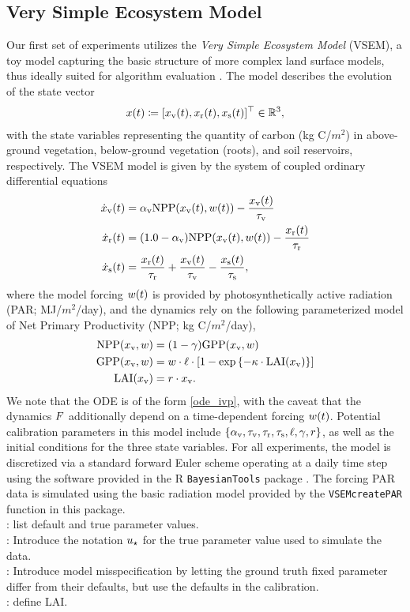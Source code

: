\documentclass[12pt]{article}
\begin{document}
\subsection{Very Simple Ecosystem Model} \label{vsem_example}
Our first set of experiments utilizes the \textit{Very Simple Ecosystem Model} (VSEM), a toy model capturing the basic 
structure of more complex land surface models, thus ideally suited for algorithm evaluation \citep{vsem}. The model 
describes the evolution of the state vector
\begin{align*}
x(t) \coloneqq [x_{\textrm{v}}(t), x_{\textrm{r}}(t), x_{\textrm{s}}(t)]^\top \in \mathbb{R}^{3}, 
\end{align*}
with the state variables representing the quantity of carbon (\textrm{kg C/$m^2$}) in above-ground vegetation, below-ground 
vegetation (roots), and soil reservoirs, respectively. The VSEM model is given by the system of coupled 
ordinary differential equations
\begin{align}
\dot{x}_{\textrm{v}}(t) &= \alpha_{\textrm{v}} \textrm{NPP}(x_{\textrm{v}}(t), w(t)) - \frac{x_{\textrm{v}}(t)}{\tau_{\textrm{v}}} \\
\dot{x}_{\textrm{r}}(t) &= (1.0 - \alpha_{\textrm{v}}) \textrm{NPP}(x_{\textrm{v}}(t), w(t)) - \frac{x_{\textrm{r}}(t)}{\tau_{\textrm{r}}} \nonumber \\ 
\dot{x}_{\textrm{s}}(t) &= \frac{x_{\textrm{r}}(t)}{\tau_{\textrm{r}}} + \frac{x_{\textrm{v}}(t)}{\tau_{\textrm{v}}} - \frac{x_{\textrm{s}}(t)}{\tau_{\textrm{s}}}, \nonumber
\end{align}
where the model forcing $w(t)$ is provided by photosynthetically active radiation 
(PAR; \textrm{MJ/$m^2$/day}), and the dynamics rely on the following parameterized model of 
Net Primary Productivity (NPP; \textrm{kg C/$m^2$/day}),
\begin{align}
\textrm{NPP}(x_{\textrm{v}}, w) &= (1 - \gamma) \textrm{GPP}(x_{\textrm{v}}, w) \\
\textrm{GPP}(x_{\textrm{v}}, w) &= w \cdot \ell \cdot \left[1 - \exp\left\{-\kappa \cdot \textrm{LAI}(x_{\textrm{v}}) \right\} \right] \nonumber \\
\textrm{LAI}(x_{\textrm{v}}) &= r \cdot x_{\textrm{v}}. \nonumber
\end{align} 
We note that the ODE is of the form \ref{ode_ivp}, with the caveat that the dynamics $F$ additionally depend on a 
time-dependent forcing $w(t)$. Potential calibration parameters in this model include 
$\{\alpha_{\textrm{v}}, \tau_{\textrm{v}}, \tau_{\textrm{r}}, \tau_{\textrm{s}}, \ell, \gamma, r\}$, as well as the initial conditions for the three state variables. 
For all experiments, the model is discretized via a standard forward Euler scheme operating at a daily time step using the 
software provided in the R \verb+BayesianTools+ package \citep{vsem}. The forcing PAR data is simulated using the basic
radiation model provided by the \verb+VSEMcreatePAR+ function in this package. \\
\todo: list default and true parameter values. \\
\todo: Introduce the notation $u_{\star}$ for the true parameter value used to simulate the data. \\
\todo: Introduce model misspecification by letting the ground truth fixed parameter differ from their defaults, but use the 
defaults in the calibration. \\
\todo: define LAI.
\end{document}
